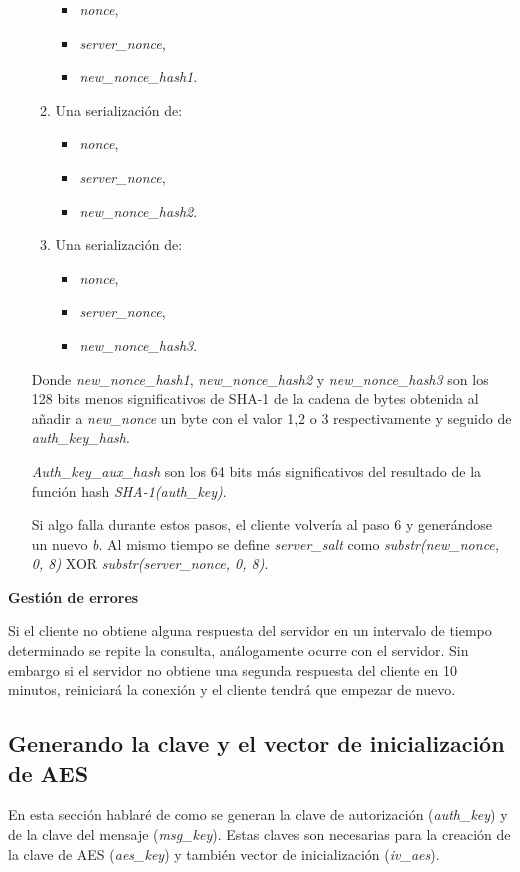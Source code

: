 \begin{enumerate}
\begin{enumerate}
			\begin{itemize}
				\item \emph{nonce},
				\item \emph{server\_nonce},
				\item \emph{new\_nonce\_hash1}.
			\end{itemize}
		\item Una serialización de:
			\begin{itemize}
				\item \emph{nonce},	
				\item \emph{server\_nonce},
				\item \emph{new\_nonce\_hash2}.
			\end{itemize}
		\item Una serialización de:
			\begin{itemize}
				\item \emph{nonce},	
				\item \emph{server\_nonce},
				\item \emph{new\_nonce\_hash3}.
			\end{itemize}
	\end{enumerate}
	Donde \emph{new\_nonce\_hash1}, \emph{new\_nonce\_hash2} y \emph{new\_nonce\_hash3} son los 128 bits menos significativos de SHA-1 de la cadena de bytes obtenida al añadir a \emph{new\_nonce} un byte con el valor 1,2 o 3 respectivamente y seguido de \emph{auth\_key\_hash}.

	\emph{Auth\_key\_aux\_hash} son los 64 bits más significativos del resultado de la función hash \emph{SHA-1(auth\_key)}.

	Si algo falla durante estos pasos, el cliente volvería al paso 6 y generándose un nuevo \emph{b}. Al mismo tiempo se define \emph{server\_salt} como \emph{substr(new\_nonce, 0, 8)} XOR \emph{substr(server\_nonce, 0, 8)}.
\end{enumerate}
\textbf{Gestión de errores}

Si el cliente no obtiene alguna respuesta del servidor en un intervalo de tiempo determinado se repite la consulta, análogamente ocurre con el servidor. Sin embargo si el servidor no obtiene una segunda respuesta del cliente en 10 minutos, reiniciará la conexión y el cliente tendrá que empezar de nuevo.

\subsection{Generando la clave y el vector de inicialización de AES}
En esta sección hablaré de como se generan la clave de autorización (\emph{auth\_key}) y de la clave del mensaje (\emph{msg\_key}). Estas claves son necesarias para la creación de la clave de AES (\emph{aes\_key}) y también vector de inicialización (\emph{iv\_aes}).

